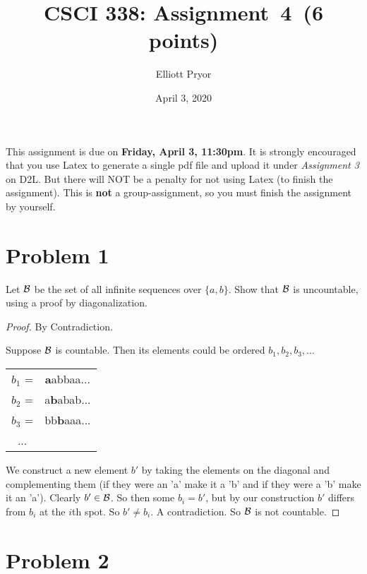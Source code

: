 \documentclass[11pt]{article}
\begin{document}
\date{April 3, 2020}
\title{CSCI 338: Assignment~4~(6 points)}

\author{Elliott Pryor}


\maketitle

\noindent
This assignment is due on {\bf Friday, April 3, 11:30pm}. It is strongly
encouraged that you use Latex to generate a single pdf file and upload it
under {\em Assignment 3} on D2L. But there will NOT be a penalty for not
using Latex (to finish the assignment). This is {\bf not} a group-assignment,
so you must finish the assignment by yourself.

\section*{Problem 1}

Let ${\cal B}$ be the set of all infinite sequences over $\{a,b\}$. Show that
${\cal B}$ is uncountable, using a proof by diagonalization.


\begin{proof} By Contradiction.


Suppose ${\cal B}$ is countable. Then its elements could be ordered $b_1, b_2, b_3, ...$

\begin{table}[H]
\centering
	\begin{tabular}{c c}
	$b_1$ =& \textbf{a}abbaa...\\
	$b_2$ =& a\textbf{b}abab...\\
	$b_3$ =& bb\textbf{b}aaa...\\
	... & \\
	\end{tabular}
\end{table}

We construct a new element $b'$ by taking the elements on the diagonal and complementing them (if they were an 'a' make it a 'b' and if they were a 'b' make it an 'a'). Clearly $b' \in {\cal B}$. So then some $b_i = b'$, but by our construction $b'$ differs from $b_i$ at the $i$th spot. So $b' \neq b_i$. A contradiction. So ${\cal B}$ is not countable.
\end{proof}


\newpage
\section*{Problem 2}
\end{document}
